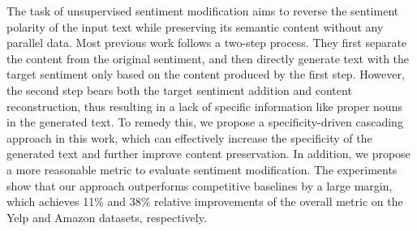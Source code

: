 The task of unsupervised sentiment modification aims to reverse the sentiment polarity of the input text while preserving its semantic content without any parallel data. Most previous work follows a two-step process. They first separate the content from the original sentiment, and then directly generate text with the target sentiment only based on the content produced by the first step. However, the second step bears both the target sentiment addition and content reconstruction, thus resulting in a lack of specific information like proper nouns in the generated text. To remedy this, we propose a specificity-driven cascading approach in this work, which can effectively increase the specificity of the generated text and further improve content preservation. In addition, we propose a more reasonable metric to evaluate sentiment modification. The experiments show that our approach outperforms competitive baselines by a large margin, which achieves 11\% and 38\% relative improvements of the overall metric on the Yelp and Amazon datasets, respectively.